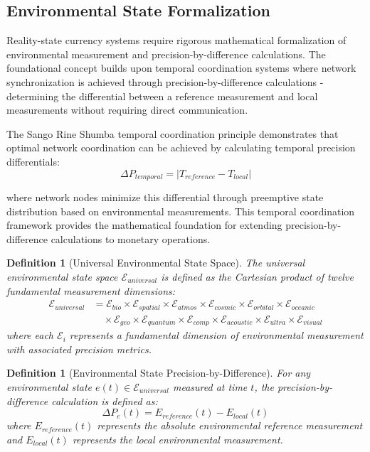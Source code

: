 \documentclass[12pt,a4paper]{article}
\newtheorem{definition}[theorem]{Definition}
\begin{document}
\subsection{Environmental State Formalization}

Reality-state currency systems require rigorous mathematical formalization of environmental measurement and precision-by-difference calculations. The foundational concept builds upon temporal coordination systems where network synchronization is achieved through precision-by-difference calculations - determining the differential between a reference measurement and local measurements without requiring direct communication.

The Sango Rine Shumba temporal coordination principle demonstrates that optimal network coordination can be achieved by calculating temporal precision differentials:
\begin{equation}
\Delta P_{temporal} = |T_{reference} - T_{local}|
\end{equation}

where network nodes minimize this differential through preemptive state distribution based on environmental measurements. This temporal coordination framework provides the mathematical foundation for extending precision-by-difference calculations to monetary operations.

\begin{definition}[Universal Environmental State Space]
The universal environmental state space $\mathcal{E}_{universal}$ is defined as the Cartesian product of twelve fundamental measurement dimensions:
\begin{align}
\mathcal{E}_{universal} &= \mathcal{E}_{bio} \times \mathcal{E}_{spatial} \times \mathcal{E}_{atmos} \times \mathcal{E}_{cosmic} \times \mathcal{E}_{orbital} \times \mathcal{E}_{oceanic} \\
&\quad \times \mathcal{E}_{geo} \times \mathcal{E}_{quantum} \times \mathcal{E}_{comp} \times \mathcal{E}_{acoustic} \times \mathcal{E}_{ultra} \times \mathcal{E}_{visual}
\end{align}
where each $\mathcal{E}_i$ represents a fundamental dimension of environmental measurement with associated precision metrics.
\end{definition}

\begin{definition}[Environmental State Precision-by-Difference]
For any environmental state $e(t) \in \mathcal{E}_{universal}$ measured at time $t$, the precision-by-difference calculation is defined as:
\begin{equation}
\Delta P_e(t) = E_{reference}(t) - E_{local}(t)
\end{equation}
where $E_{reference}(t)$ represents the absolute environmental reference measurement and $E_{local}(t)$ represents the local environmental measurement.
\end{definition}
\end{document}
